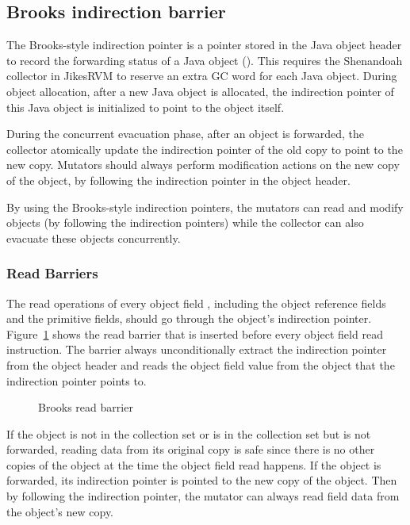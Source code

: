 \subsection{Brooks indirection barrier}


The Brooks-style indirection pointer is a pointer stored in the Java object header
to record the forwarding status of a Java object (\cite{flood2016shenandoah}).
This requires the Shenandoah collector in JikesRVM to reserve an extra GC word for each
Java object. During object allocation, after a new Java object is allocated, the indirection
pointer of this Java object is initialized to point to the object itself.

During the concurrent evacuation phase, after an object is forwarded,
the collector atomically update the indirection pointer of the old copy to point to the new copy.
Mutators should always perform modification actions on the new copy of the object,
by following the indirection pointer in the object header.

By using the Brooks-style indirection pointers, the mutators can read and modify objects
(by following the indirection pointers) while the collector can also evacuate these
objects concurrently.

\subsubsection{Read Barriers}

The read operations of every object field , including the object
reference fields and the primitive fields, should go through the object's indirection pointer.
Figure~\ref{fig:brooksreadbarrier} shows the read barrier that is inserted before every object field read instruction.
The barrier always unconditionally extract the indirection pointer from the object header
and reads the object field value from the object that the indirection pointer points to.

\begin{figure}
  \centering
  
  \caption{Brooks read barrier}
  \label{fig:brooksreadbarrier}
\end{figure}

If the object is not in the collection set or is in the collection set but is not forwarded,
reading data from its original copy is safe since there is no other copies of the object
at the time the object field read happens.
If the object is forwarded, its indirection pointer is pointed to the new copy of the object.
Then by following the indirection pointer, the mutator can always read field data from the object's new copy.

